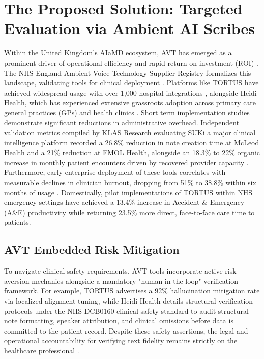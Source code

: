 \documentclass[11pt,a4paper]{article}
\begin{document}
\section{The Proposed Solution: Targeted Evaluation via Ambient AI Scribes}
\label{The Proposed Solution: Targeted Evaluation via Ambient AI Scribes}


Within the United Kingdom’s AIaMD ecosystem, AVT has emerged as a prominent driver of operational efficiency and rapid return on investment (ROI) \cite{hitconsultant2026klas} . The NHS England Ambient Voice Technology Supplier Registry formalizes this landscape, validating tools for clinical deployment \cite{nhsedigital2026registry} . Platforms like TORTUS have achieved widespread usage with over 1,000 hospital integrations \cite{tortus2026} , alongside Heidi Health, which has experienced extensive grassroots adoption across primary care general practices (GPs) and health clinics \cite{heidihealth2026safety} . Short term implementation studies demonstrate significant reductions in administrative overhead. Independent validation metrics compiled by KLAS Research evaluating SUKi a major clinical intelligence platform recorded a 26.8\% reduction in note creation time at McLeod Health and a 21\% reduction at FMOL Health, alongside an 18.3\% to 22\% organic increase in monthly patient encounters driven by recovered provider capacity \cite{hitconsultant2026klas} . Furthermore, early enterprise deployment of these tools correlates with measurable declines in clinician burnout, dropping from 51\% to 38.8\% within six months of usage \cite{hitconsultant2026klas} . Domestically, pilot implementations of TORTUS within NHS emergency settings have achieved a 13.4\% increase in Accident \& Emergency (A\&E) productivity while returning 23.5\% more direct, face-to-face care time to patients. \cite{tortus2026}


\subsection{ AVT Embedded Risk Mitigation}
\label{sec:AVT Embedded Risk Mitigation}

To navigate clinical safety requirements, AVT tools incorporate active risk aversion mechanics alongside a mandatory "human-in-the-loop" verification framework. For example, TORTUS advertises a 92\% hallucination mitigation rate via localized alignment tuning, while Heidi Health details structural verification protocols under the NHS DCB0160 clinical safety standard to audit structural note formatting, speaker attribution, and clinical omissions before data is committed to the patient record. Despite these safety assertions, the legal and operational accountability for verifying text fidelity remains strictly on the healthcare professional \cite{tortus2026} \cite{heidihealth2026safety} . 
\end{document}
